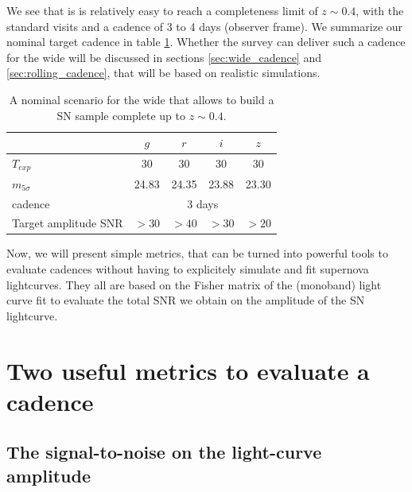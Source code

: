 \documentclass[\docopts]{\docclass}
\begin{document}
We see that is is relatively easy to reach a completeness limit of $z
\sim 0.4$, with the standard visits and a cadence of 3 to 4 days
(observer frame).  We summarize our nominal target cadence in table
\ref{tab:nominal_scenario_wide}. Whether the survey can deliver such a
cadence for the wide will be discussed in sections
\ref{sec:wide_cadence} and \ref{sec:rolling_cadence}, that will be
based on realistic  simulations.


\begin{table}[t]
\begin{center}
\caption{A nominal scenario for the wide that allows to build a SN
  sample complete up to $z \sim 0.4$.}
\label{tab:nominal_scenario_wide}
\begin{tabular}{l|cccc}
\hline
\hline
              & $g$ & $r$ & $i$ & $z$ \\
\hline 
$T_{exp}$      & 30       &   30    &  30        & 30       \\
$m_{5\sigma}$  &  24.83   &  24.35   &  23.88    &  23.30   \\
cadence       &  \multicolumn{4}{c}{3 days} \\
Target amplitude SNR & $>30$ & $>40$ & $>30$ & $>20$ \\
\hline
\end{tabular}
\end{center}
\end{table}


Now, we will present simple metrics, that can be turned into powerful
tools to evaluate  cadences without having to explicitely
simulate and fit supernova lightcurves.  They all are based on the
Fisher matrix of the (monoband) light curve fit to evaluate the total
SNR we obtain on the amplitude of the SN lightcurve.



\section{Two useful metrics to evaluate a cadence}
\label{sec:metric}


\subsection{The signal-to-noise on the light-curve amplitude}
\end{document}
